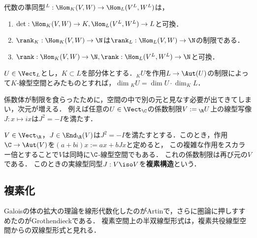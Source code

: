 \documentclass[uplatex, dvipdfmx]{jsreport}
\begin{document}
\begin{proposition}[係数拡大線型写像の性質]
    代数の準同型${}^L:\Hom_K(V,W)\to\Hom_L(V^L,W^L)$は，
    \begin{enumerate}
        \item $\det:\Hom_K(V,W)\to K,\Hom_L(V^L,W^L)\to L$と可換．
        \item $\rank_K:\Hom_K(V,W)\to\N$は$\rank_L:\Hom_L(V,W)\to\N$の制限である．
        \item $\rank:\Hom_K(V,W)\to\N,\rank:\Hom_L(V^L,W^L)\to\N$と可換．
    \end{enumerate}
\end{proposition}

\begin{proposition}[係数制限]
    $U\in\Vect_L$とし，$K\subset L$を部分体とする．${}_KU$を作用$L\to\Aut(U)$の制限によって$K$-線型空間とみたものとすれば，$\dim{}_KU=\dim U\cdot\dim_KL$．
\end{proposition}
\begin{remarks}
    係数体が制限を食らったために，空間の中で別の元と見なす必要が出てきてしまい，次元が増える．
    例えば任意の$U\in\Vect_\C$の係数制限$V:={}_\R U$上の線型写像$J:x\mapsto ix$は$J^2=-I$を満たす．
\end{remarks}

\begin{proposition}[複素構造による複素化]
    $V\in\Vect_\R$，$J\in\End_\R(V)$は$J^2=-I$を満たすとする．このとき，作用$\C\to\Aut(V)$を$(a+bi)x:=ax+bJx$と定めると，
    この複雑な作用をスカラー倍とすることで$V$は同時に$\C$-線型空間でもある．
    これの係数制限は再び元の$V$である．
    このときの実線型同型$J:V\iso V$を\textbf{複素構造}という．
\end{proposition}

\subsection{複素化}

\begin{tcolorbox}[colframe=ForestGreen, colback=ForestGreen!10!white,breakable,colbacktitle=ForestGreen!40!white,coltitle=black,fonttitle=\bfseries\sffamily,
title=]
    Galoisの体の拡大の理論を線形代数化したのがArtinで，さらに圏論に押しすすめたのがGrothendieckである．
    複素空間上の半双線型形式は，複素共役線型空間からの双線型形式と見れる．
\end{tcolorbox}
\end{document}

